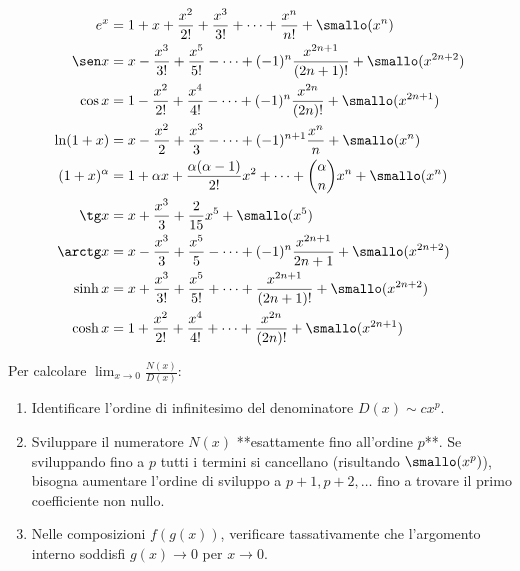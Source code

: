 \begin{metodo}
\begin{align*}
    e^x &= 1 + x + \frac{x^2}{2!} + \frac{x^3}{3!} + \dots + \frac{x^n}{n!} + \smallo(x^n) \\
    \sen x &= x - \frac{x^3}{3!} + \frac{x^5}{5!} - \dots + (-1)^n \frac{x^{2n+1}}{(2n+1)!} + \smallo(x^{2n+2}) \\
    \cos x &= 1 - \frac{x^2}{2!} + \frac{x^4}{4!} - \dots + (-1)^n \frac{x^{2n}}{(2n)!} + \smallo(x^{2n+1}) \\
    \ln(1 + x) &= x - \frac{x^2}{2} + \frac{x^3}{3} - \dots + (-1)^{n+1}\frac{x^n}{n} + \smallo(x^n) \\
    (1 + x)^\alpha &= 1 + \alpha x + \frac{\alpha(\alpha-1)}{2!}x^2 + \dots + \binom{\alpha}{n}x^n + \smallo(x^n) \\
    \tg x &= x + \frac{x^3}{3} + \frac{2}{15}x^5 + \smallo(x^5) \\
    \arctg x &= x - \frac{x^3}{3} + \frac{x^5}{5} - \dots + (-1)^n \frac{x^{2n+1}}{2n+1} + \smallo(x^{2n+2}) \\
    \sinh x &= x + \frac{x^3}{3!} + \frac{x^5}{5!} + \dots + \frac{x^{2n+1}}{(2n+1)!} + \smallo(x^{2n+2}) \\
    \cosh x &= 1 + \frac{x^2}{2!} + \frac{x^4}{4!} + \dots + \frac{x^{2n}}{(2n)!} + \smallo(x^{2n+1})
\end{align*}
\end{metodo}

\begin{esame}
Per calcolare $\lim_{x \to 0} \frac{N(x)}{D(x)}$:
\begin{enumerate}
    \item Identificare l'ordine di infinitesimo del denominatore $D(x) \sim c x^p$.
    \item Sviluppare il numeratore $N(x)$ **esattamente fino all'ordine $p$**. Se sviluppando fino a $p$ tutti i termini si cancellano (risultando $\smallo(x^p)$), bisogna aumentare l'ordine di sviluppo a $p+1, p+2, \dots$ fino a trovare il primo coefficiente non nullo.
    \item Nelle composizioni $f(g(x))$, verificare tassativamente che l'argomento interno soddisfi $g(x) \to 0$ per $x \to 0$.
\end{enumerate}
\end{esame}
